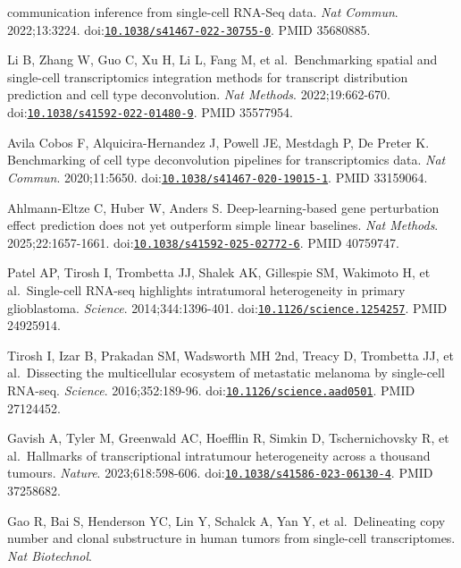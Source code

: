 \documentclass[11pt]{article}
\begin{document}
\begin{enumerate}[label={[\arabic*]},leftmargin=2.6em,labelsep=0.5em,itemsep=1.5pt]
  communication inference from single-cell RNA-Seq data. \emph{Nat
  Commun}. 2022;13:3224.
  doi:\href{https://doi.org/10.1038/s41467-022-30755-0}{\nolinkurl{10.1038/s41467-022-30755-0}}.
  PMID 35680885.
\item
  Li B, Zhang W, Guo C, Xu H, Li L, Fang M, et al.~Benchmarking spatial
  and single-cell transcriptomics integration methods for transcript
  distribution prediction and cell type deconvolution. \emph{Nat
  Methods}. 2022;19:662-670.
  doi:\href{https://doi.org/10.1038/s41592-022-01480-9}{\nolinkurl{10.1038/s41592-022-01480-9}}.
  PMID 35577954.
\item
  Avila Cobos F, Alquicira-Hernandez J, Powell JE, Mestdagh P, De Preter
  K. Benchmarking of cell type deconvolution pipelines for
  transcriptomics data. \emph{Nat Commun}. 2020;11:5650.
  doi:\href{https://doi.org/10.1038/s41467-020-19015-1}{\nolinkurl{10.1038/s41467-020-19015-1}}.
  PMID 33159064.
\item
  Ahlmann-Eltze C, Huber W, Anders S. Deep-learning-based gene
  perturbation effect prediction does not yet outperform simple linear
  baselines. \emph{Nat Methods}. 2025;22:1657-1661.
  doi:\href{https://doi.org/10.1038/s41592-025-02772-6}{\nolinkurl{10.1038/s41592-025-02772-6}}.
  PMID 40759747.
\item
  Patel AP, Tirosh I, Trombetta JJ, Shalek AK, Gillespie SM, Wakimoto H,
  et al.~Single-cell RNA-seq highlights intratumoral heterogeneity in
  primary glioblastoma. \emph{Science}. 2014;344:1396-401.
  doi:\href{https://doi.org/10.1126/science.1254257}{\nolinkurl{10.1126/science.1254257}}.
  PMID 24925914.
\item
  Tirosh I, Izar B, Prakadan SM, Wadsworth MH 2nd, Treacy D, Trombetta
  JJ, et al.~Dissecting the multicellular ecosystem of metastatic
  melanoma by single-cell RNA-seq. \emph{Science}. 2016;352:189-96.
  doi:\href{https://doi.org/10.1126/science.aad0501}{\nolinkurl{10.1126/science.aad0501}}.
  PMID 27124452.
\item
  Gavish A, Tyler M, Greenwald AC, Hoefflin R, Simkin D, Tschernichovsky
  R, et al.~Hallmarks of transcriptional intratumour heterogeneity
  across a thousand tumours. \emph{Nature}. 2023;618:598-606.
  doi:\href{https://doi.org/10.1038/s41586-023-06130-4}{\nolinkurl{10.1038/s41586-023-06130-4}}.
  PMID 37258682.
\item
  Gao R, Bai S, Henderson YC, Lin Y, Schalck A, Yan Y, et
  al.~Delineating copy number and clonal substructure in human tumors
  from single-cell transcriptomes. \emph{Nat Biotechnol}.

\end{enumerate}
\end{document}
